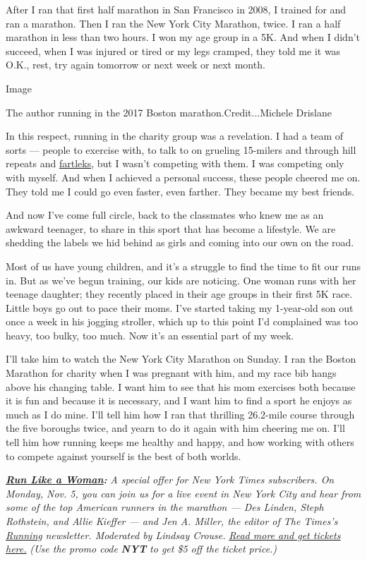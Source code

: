 After I ran that first half marathon in San Francisco in 2008, I trained
for and ran a marathon. Then I ran the New York City Marathon, twice. I
ran a half marathon in less than two hours. I won my age group in a 5K.
And when I didn't succeed, when I was injured or tired or my legs
cramped, they told me it was O.K., rest, try again tomorrow or next week
or next month.

Image

The author running in the 2017 Boston marathon.Credit...Michele Drislane

In this respect, running in the charity group was a revelation. I had a
team of sorts --- people to exercise with, to talk to on grueling
15-milers and through hill repeats and
\href{https://www.runnersworld.com/advanced/a20816077/finding-fartlek/}{fartleks},
but I wasn't competing with them. I was competing only with myself. And
when I achieved a personal success, these people cheered me on. They
told me I could go even faster, even farther. They became my best
friends.

And now I've come full circle, back to the classmates who knew me as an
awkward teenager, to share in this sport that has become a lifestyle. We
are shedding the labels we hid behind as girls and coming into our own
on the road.

Most of us have young children, and it's a struggle to find the time to
fit our runs in. But as we've begun training, our kids are noticing. One
woman runs with her teenage daughter; they recently placed in their age
groups in their first 5K race. Little boys go out to pace their moms.
I've started taking my 1-year-old son out once a week in his jogging
stroller, which up to this point I'd complained was too heavy, too
bulky, too much. Now it's an essential part of my week.

I'll take him to watch the New York City Marathon on Sunday. I ran the
Boston Marathon for charity when I was pregnant with him, and my race
bib hangs above his changing table. I want him to see that his mom
exercises both because it is fun and because it is necessary, and I want
him to find a sport he enjoys as much as I do mine. I'll tell him how I
ran that thrilling 26.2-mile course through the five boroughs twice, and
yearn to do it again with him cheering me on. I'll tell him how running
keeps me healthy and happy, and how working with others to compete
against yourself is the best of both worlds.

\textbf{\href{https://timesevents.nytimes3xbfgragh.onion/nytrunning}{\emph{Run
Like a Woman}}\emph{:}} \emph{A special offer for New York Times
subscribers. On Monday, Nov. 5, you can join us for a live event in New
York City and hear from some of the top American runners in the marathon
--- Des Linden, Steph Rothstein, and Allie Kieffer --- and Jen A.
Miller, the editor of The Times's}
\href{https://www.nytimes3xbfgragh.onion/newsletters/running?module=inline}{\emph{Running}}
\emph{newsletter. Moderated by Lindsay Crouse.}
\href{https://timesevents.nytimes3xbfgragh.onion/nytrunning}{\emph{Read
more and get tickets here.}} \emph{(Use the promo code}
\emph{\textbf{NYT}} \emph{to get \$5 off the ticket price.)}

